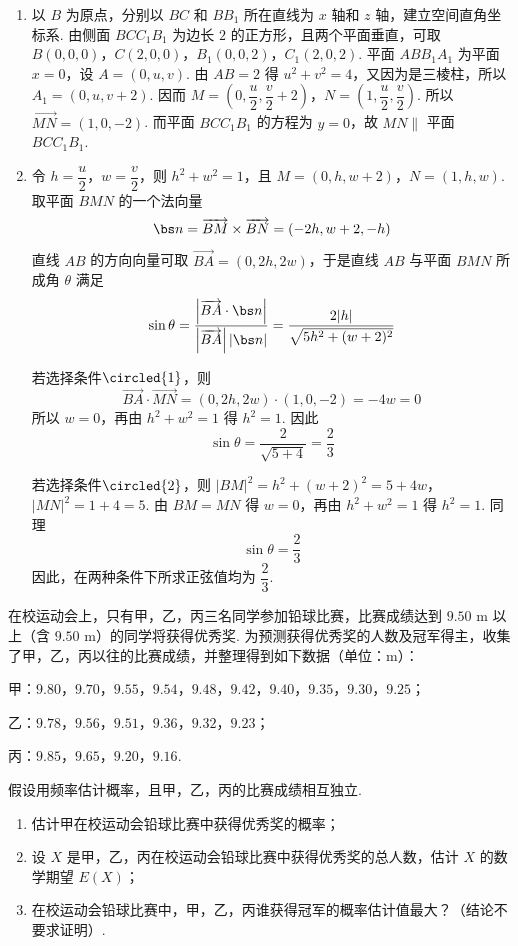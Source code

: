 \begin{solution}
\begin{enumerate}
\item 以 \(B\) 为原点，分别以 \(BC\) 和 \(BB_1\) 所在直线为 \(x\) 轴和 \(z\) 轴，建立空间直角坐标系. 由侧面 \(BCC_1B_1\) 为边长 \(2\) 的正方形，且两个平面垂直，可取
\(B(0,0,0)\)，\(C(2,0,0)\)，\(B_1(0,0,2)\)，\(C_1(2,0,2)\).
平面 \(ABB_1A_1\) 为平面 \(x=0\)，设 \(A=(0,u,v)\). 由 \(AB=2\) 得 \(u^2+v^2=4\)，又因为是三棱柱，所以 \(A_1=(0,u,v+2)\). 因而
\(M=\left(0,\dfrac{u}{2},\dfrac{v}{2}+2\right)\)，\(N=\left(1,\dfrac{u}{2},\dfrac{v}{2}\right)\).
所以 \(\overrightarrow{MN}=(1,0,-2)\). 而平面 \(BCC_1B_1\) 的方程为 \(y=0\)，故 \(MN\parallel\) 平面 \(BCC_1B_1\).

\item 令 \(h=\dfrac{u}{2}\)，\(w=\dfrac{v}{2}\)，则 \(h^2+w^2=1\)，且
\(M=(0,h,w+2)\)，\(N=(1,h,w)\).
取平面 \(BMN\) 的一个法向量
\[
\bs n=\overrightarrow{BM}\times\overrightarrow{BN}=(-2h,w+2,-h)
\]
直线 \(AB\) 的方向向量可取 \(\overrightarrow{BA}=(0,2h,2w)\)，于是直线 \(AB\) 与平面 \(BMN\) 所成角 \(\theta\) 满足
\[
\sin\theta=\dfrac{\left|\overrightarrow{BA}\cdot\bs n\right|}{\left|\overrightarrow{BA}\right|\left|\bs n\right|}
=\dfrac{2|h|}{\sqrt{5h^2+(w+2)^2}}
\]

若选择条件\(\circled{1}\)，则
\[
\overrightarrow{BA}\cdot\overrightarrow{MN}=(0,2h,2w)\cdot(1,0,-2)=-4w=0
\]
所以 \(w=0\)，再由 \(h^2+w^2=1\) 得 \(h^2=1\). 因此
\[
\sin\theta=\dfrac{2}{\sqrt{5+4}}=\dfrac{2}{3}
\]

若选择条件\(\circled{2}\)，则
\(|BM|^2=h^2+(w+2)^2=5+4w\)，\(|MN|^2=1+4=5\).
由 \(BM=MN\) 得 \(w=0\)，再由 \(h^2+w^2=1\) 得 \(h^2=1\). 同理
\[
\sin\theta=\dfrac{2}{3}
\]
因此，在两种条件下所求正弦值均为 \(\dfrac{2}{3}\).
\end{enumerate}
\end{solution}

\begin{problem}
在校运动会上，只有甲，乙，丙三名同学参加铅球比赛，比赛成绩达到 \(9.50\text{ m}\) 以上（含 \(9.50\text{ m}\)）的同学将获得优秀奖. 为预测获得优秀奖的人数及冠军得主，收集了甲，乙，丙以往的比赛成绩，并整理得到如下数据（单位：\(\mathrm{m}\)）：

甲：\(9.80\)，\(9.70\)，\(9.55\)，\(9.54\)，\(9.48\)，\(9.42\)，\(9.40\)，\(9.35\)，\(9.30\)，\(9.25\)；

乙：\(9.78\)，\(9.56\)，\(9.51\)，\(9.36\)，\(9.32\)，\(9.23\)；

丙：\(9.85\)，\(9.65\)，\(9.20\)，\(9.16\).

假设用频率估计概率，且甲，乙，丙的比赛成绩相互独立.

\begin{enumerate}
\item 估计甲在校运动会铅球比赛中获得优秀奖的概率；

\item 设 \(X\) 是甲，乙，丙在校运动会铅球比赛中获得优秀奖的总人数，估计 \(X\) 的数学期望 \(E(X)\)；

\item 在校运动会铅球比赛中，甲，乙，丙谁获得冠军的概率估计值最大？（结论不要求证明）.
\end{enumerate}
\end{problem}


